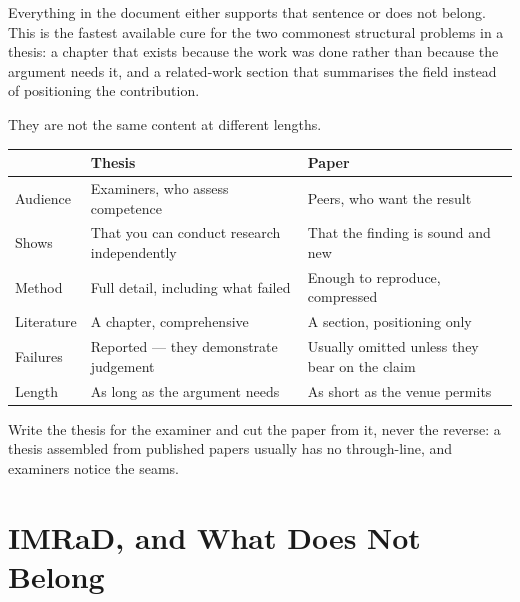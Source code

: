 Everything in the document either supports that sentence or does not belong.
This is the fastest available cure for the two commonest structural problems in
a thesis: a chapter that exists because the work was done rather than because
the argument needs it, and a related-work section that summarises the field
instead of positioning the contribution.

\begin{conceptbox}
They are not the same content at different lengths.

\begin{center}
\small
\begin{tabular}{@{}L{3.0cm}L{5.4cm}L{5.5cm}@{}}
\toprule
 & \textbf{Thesis} & \textbf{Paper} \\
\midrule
Audience   & Examiners, who assess competence
           & Peers, who want the result \\
Shows      & That you can conduct research independently
           & That the finding is sound and new \\
Method     & Full detail, including what failed
           & Enough to reproduce, compressed \\
Literature & A chapter, comprehensive
           & A section, positioning only \\
Failures   & Reported --- they demonstrate judgement
           & Usually omitted unless they bear on the claim \\
Length     & As long as the argument needs
           & As short as the venue permits \\
\bottomrule
\end{tabular}
\end{center}

\medskip
Write the thesis for the examiner and cut the paper from it, never the reverse:
a thesis assembled from published papers usually has no through-line, and
examiners notice the seams.
\end{conceptbox}

\section{IMRaD, and What Does Not Belong}

